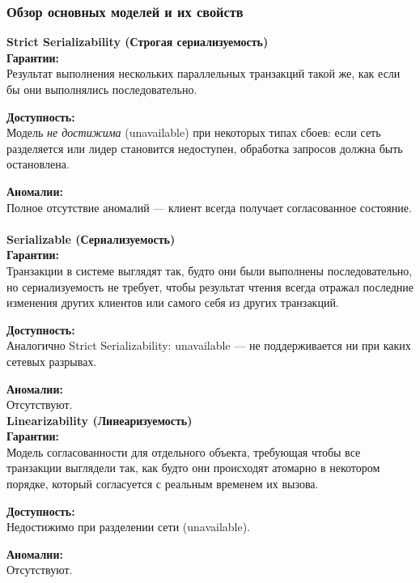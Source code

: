 \subsubsection{Обзор основных моделей и их свойств}

\textbf{Strict Serializability (Строгая сериализуемость)}~\\

\textbf{Гарантии:}  ~\\
Результат выполнения нескольких параллельных транзакций такой же, как если бы они выполнялись последовательно.

\textbf{Доступность:}  ~\\
Модель \textit{не достижима} (unavailable) при некоторых типах сбоев: если сеть разделяется или лидер становится недоступен, обработка запросов должна быть остановлена.  

\textbf{Аномалии:}  ~\\
Полное отсутствие аномалий — клиент всегда получает согласованное состояние.\autocite{jepsen-strong-serializable} ~\\

\textbf{Serializable (Сериализуемость)}~\\

\textbf{Гарантии:} ~\\ 
Транзакции в системе выглядят так, будто они были выполнены последовательно, но сериализуемость не требует, чтобы результат чтения всегда отражал последние изменения других клиентов или самого себя из других транзакций. 

\textbf{Доступность:}  ~\\
Аналогично Strict Serializability: unavailable — не поддерживается ни при каких сетевых разрывах.  

\textbf{Аномалии:}  ~\\
Отсутствуют.\autocite{jepsen-serializable}~\\

\textbf{Linearizability (Линеаризуемость)}~\\

\textbf{Гарантии:}  ~\\
Модель согласованности для отдельного объекта, требующая чтобы все транзакции выглядели так, как будто они происходят атомарно в некотором порядке, который согласуется с реальным временем их вызова.

\textbf{Доступность:}  ~\\
Недостижимо при разделении сети (unavailable).  

\textbf{Аномалии:}  ~\\
Отсутствуют.\autocite{jepsen-linearizable}~\\

